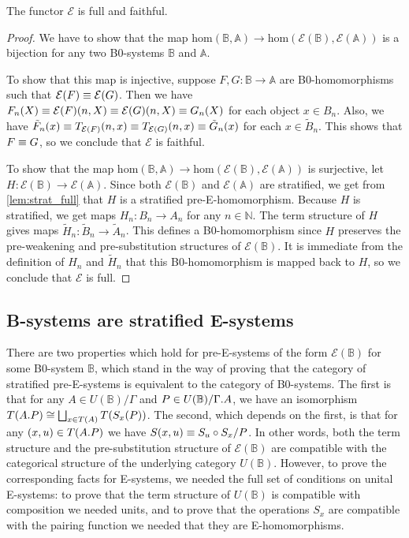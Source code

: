 \begin{thm}
The functor $\mathcal{E}$ is full and faithful.
\end{thm}

\begin{proof}
We have to show that the map $\mathrm{hom}(\mathbb{B},\mathbb{A})\to
\mathrm{hom}(\mathcal{E}(\mathbb{B}),\mathcal{E}(\mathbb{A}))$ is a bijection
for any two B0-systems $\mathbb{B}$ and $\mathbb{A}$.

To show that this map is injective, suppose $F,G:\mathbb{B}\to\mathbb{A}$ are 
B0-homomorphisms such that $\mathcal{E}(F)\equiv\mathcal{E}(G)$. Then we have
$F_n(X)\equiv\mathcal{E}(F)(n,X)\equiv \mathcal{E}(G)(n,X)\equiv G_n(X)$ for each
object $x\in B_n$. Also, we have $\tilde{F}_n(x)\equiv T_{\mathcal{E}(F)}(n,x)
\equiv T_{\mathcal{E}(G)}(n,x)\equiv \tilde{G}_n(x)$ for each
$x\in\tilde{B}_n$. This shows that $F\equiv G$, so we conclude that $\mathcal{E}$
is faithful.  

To show that the map $\mathrm{hom}(\mathbb{B},\mathbb{A})\to
\mathrm{hom}(\mathcal{E}(\mathbb{B}),\mathcal{E}(\mathbb{A}))$ 
is surjective, let $H:\mathcal{E}(\mathbb{B})\to
\mathcal{E}(\mathbb{A})$. Since both $\mathcal{E}(\mathbb{B})$ and
$\mathcal{E}(\mathbb{A})$ are stratified, we get from
\autoref{lem:strat_full} that $H$ is a stratified pre-E-homomorphism. 
Because $H$ is stratified, we get maps $H_n:B_n\to A_n$ for any $n\in\mathbb{N}$.
The term structure of $H$ gives maps $\tilde{H}_n:
\tilde{B}_n\to\tilde{A}_n$. This defines a B0-homomorphism since $H$ 
preserves the pre-weakening and pre-substitution structures of $\mathcal{E}(\mathbb{B})$.
It is immediate from the definition of $H_n$ and
$\tilde{H}_n$ that this B0-homomorphism is mapped back to $H$, so we conclude
that $\mathcal{E}$ is full.
\end{proof}

\subsection{B-systems are stratified E-systems}
There are two properties which hold for pre-E-systems of the form $\mathcal{E}
(\mathbb{B})$ for some B0-system $\mathbb{B}$, 
which stand in the way of proving that the category of stratified
pre-E-systems is equivalent to the category of B0-systems. The first is that
for any $A\in U(\mathbb{B})/\Gamma$ and $P\in U(\mathbb{B})/\ctxext{\Gamma}{A}$,
we have an isomorphism $T(\ctxext{A}{P})\cong\bigsqcup_{x\in T(A)}T(S_x(P))$.
The second, which depends on the first, is that for any $(x,u)\in T(\ctxext{A}{P})$
we have $S(x,u)\equiv S_u\circ S_x/P$. In other words, both the term structure
and the pre-substitution structure of $\mathcal{E}(\mathbb{B})$ are compatible
with the categorical structure of the underlying category $U(\mathbb{B})$.
However, to prove the corresponding facts for E-systems, we needed the full
set of conditions on unital E-systems: to prove that the term structure of
$U(\mathbb{B})$ is compatible with composition we needed units, and to prove 
that the operations $S_x$ are compatible with the pairing function we needed
that they are E-homomorphisms. 

